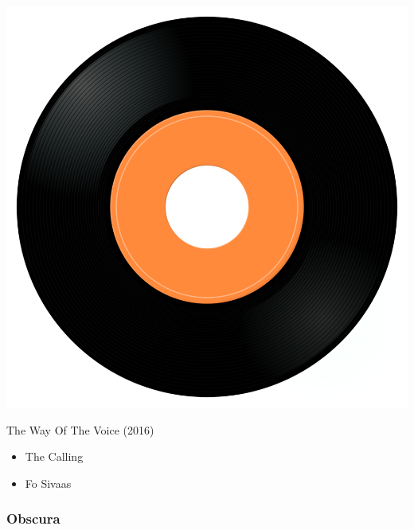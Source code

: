 \begin{minipage}[t]{0.25\textwidth}\vspace{0pt}
\captionsetup{type=figure}
\includegraphics[width=\textwidth]{Images/cover.png}
\caption*{The Way Of The Voice (2016)}
\end{minipage}
\begin{minipage}[t]{0.25\textwidth}\vspace{0pt}
\begin{itemize}[nosep,leftmargin=1em,labelwidth=*,align=left]
	\setlength{\itemsep}{0pt}
	\item The Calling
	\item Fo Sivaas
\end{itemize}
\end{minipage}

\subsubsection{Obscura}

